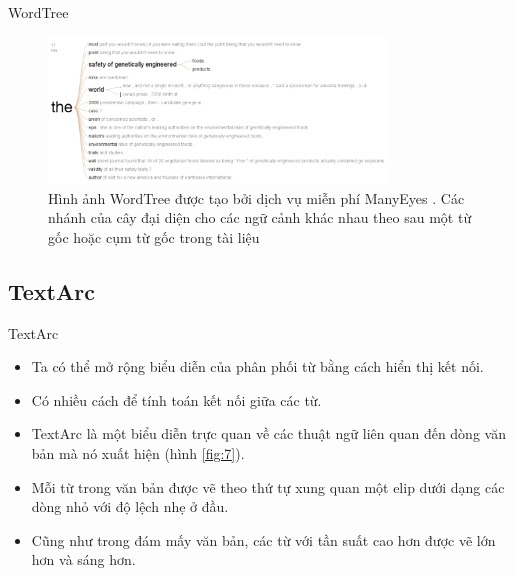 \documentclass[10pt]{beamer}
\theoremstyle{remark}
\theoremstyle{definition}
\begin{document}
\begin{frame}{WordTree}
	\begin{figure}[h!]
        \centering
        \includegraphics[width=0.8\textwidth]{6.png}
        \caption{Hình ảnh WordTree được tạo bởi dịch vụ miễn phí ManyEyes \cite{196}.
        Các nhánh của cây đại diện cho các ngữ cảnh khác nhau theo sau một từ gốc hoặc cụm từ gốc trong tài liệu}
        \label{fig:6}
    \end{figure}
\end{frame}

\subsection{TextArc}

\begin{frame}{TextArc}
	\begin{itemize}
		\item Ta có thể mở rộng biểu diễn của phân phối từ bằng cách hiển thị kết nối.
		\item Có nhiều cách để tính toán kết nối giữa các từ.
		\item TextArc \cite{312} là một biểu diễn trực quan về các thuật ngữ liên quan đến dòng văn bản mà nó xuất hiện (hình \ref{fig:7}).
		\item Mỗi từ trong văn bản được vẽ theo thứ tự xung quan một elip dưới dạng các dòng nhỏ với độ lệch nhẹ ở đầu.
		\item Cũng như trong đám mấy văn bản, các từ với tần suất cao hơn được vẽ lớn hơn và sáng hơn.
	\end{itemize}
\end{frame}
\end{document}
